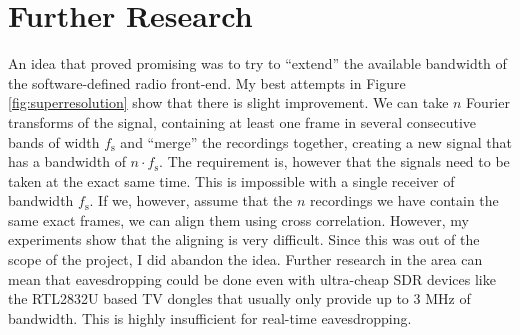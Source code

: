 \documentclass[a4paper,12pt,twoside,openright]{report}
\begin{document}
\section{Further Research}

An idea that proved promising was to try to ``extend'' the available bandwidth of the software-defined radio front-end. My best attempts in Figure \ref{fig:superresolution} show that there is slight improvement. We can take $n$ Fourier transforms of the signal, containing at least one frame in several consecutive bands of width $f_\text{s}$ and ``merge'' the recordings together, creating a new signal that has a bandwidth of $n \cdot f_\text{s}$. The requirement is, however that the signals need to be taken at the exact same time. This is impossible with a single receiver of bandwidth $f_\text{s}$. If we, however, assume that the $n$ recordings we have contain the same exact frames, we can align them using cross correlation. However, my experiments show that the aligning is very difficult. Since this was out of the scope of the project, I did abandon the idea. Further research in the area can mean that eavesdropping could be done even with ultra-cheap SDR devices like the RTL2832U based TV dongles that usually only provide up to $3$ MHz of bandwidth. This is highly insufficient for real-time eavesdropping.
\end{document}
